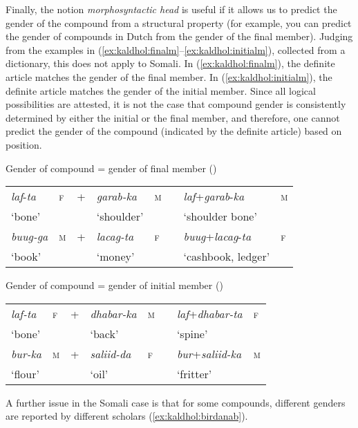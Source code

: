 \documentclass[output=paper]{langscibook}
\begin{document}
Finally, the notion \textit{morphosyntactic head} is useful if it allows us to predict the gender of the compound from a structural property (for example, you can predict the gender of compounds in Dutch from the gender of the final member). Judging from the examples in (\ref{ex:kaldhol:finalm}--\ref{ex:kaldhol:initialm}), collected from a dictionary, this does not apply to Somali. In (\ref{ex:kaldhol:finalm}), the definite article matches the gender of the final member. In (\ref{ex:kaldhol:initialm}), the definite article matches the gender of the initial member. Since all logical possibilities are attested, it is not the case that compound gender is consistently determined by either the initial or the final member, and therefore, one cannot predict the gender of the compound (indicated by the definite article) based on position.

\ea\label{ex:kaldhol:finalm}
	Gender of compound = gender of final member (\citealt{Zorc1993})\smallskip\\
	\begin{tabular}{@{}llllllll@{}}
		\textit{laf}-\textit{ta}  & \textsc{f} & + & \textit{garab-ka}  & \textsc{m} & \pil & \textit{laf}+\textit{garab}-\textit{ka}       & \textsc{m} \\
		`bone'  &   &   & `shoulder' &            &      & `shoulder bone'    &            \\
		\textit{buug-ga} & \textsc{m} & + & \textit{lacag-ta}   & \textsc{f} & \pil & \textit{buug}+\textit{lacag}-\textit{ta}      & \textsc{f} \\
		`book'  &   &   & `money'    &            &      & `cashbook, ledger' &
	\end{tabular}
\ex\label{ex:kaldhol:initialm}
	Gender of compound = gender of initial member (\citealt{Zorc1993})\smallskip\\
	\begin{tabular}{@{}llllllll@{}}
		\textit{laf-ta}  & \textsc{f} & + & \textit{dhabar-ka}      & \textsc{m} & \pil & \textit{laf}+\textit{dhabar-ta}  & \textsc{f} \\
		`bone'  &            &   & `back' &   &      & `spine'      &            \\
		\textit{bur-ka}  & \textsc{m} & + & \textit{saliid-da}     & \textsc{f} & \pil & \textit{bur}+\textit{saliid-ka} & \textsc{m} \\
		`flour' &            &   & `oil'         &   &      & `fritter'     &
	\end{tabular}
\z
A further issue in the Somali case is that for some compounds, different genders are reported by different scholars (\ref{ex:kaldhol:birdanab}).
\end{document}
